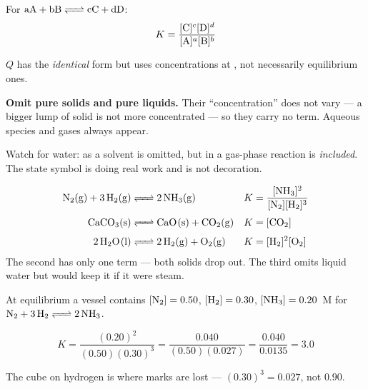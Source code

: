 \documentclass{apchem-notes}
\begin{document}


For $\ce{aA + bB <=> cC + dD}$:
\[ K = \frac{[\ce{C}]^c[\ce{D}]^d}{[\ce{A}]^a[\ce{B}]^b} \]

$Q$ has the \emph{identical} form but uses concentrations at
, not necessarily equilibrium ones.

\begin{apctrap}
\textbf{Omit pure solids and pure liquids.} Their ``concentration'' does not
vary --- a bigger lump of solid is not more concentrated --- so they carry
no term. Aqueous species and gases always appear.

Watch for water:  as a solvent is omitted, but  in a
gas-phase reaction is \emph{included}. The state symbol is doing real work
and is not decoration.
\end{apctrap}

\begin{workedexample}
\begin{align*}
  \ce{N2(g) + 3H2(g) &<=> 2NH3(g)}
    &K &= \frac{[\ce{NH3}]^2}{[\ce{N2}][\ce{H2}]^3} \\[0.3em]
  \ce{CaCO3(s) &<=> CaO(s) + CO2(g)}
    &K &= [\ce{CO2}] \\[0.3em]
  \ce{2H2O(l) &<=> 2H2(g) + O2(g)}
    &K &= [\ce{H2}]^2[\ce{O2}]
\end{align*}
The second has only one term --- both solids drop out. The third omits
liquid water but would keep it if it were steam.
\end{workedexample}



\begin{workedexample}
At equilibrium a vessel contains $[\ce{N2}] = 0.50$,
$[\ce{H2}] = 0.30$, $[\ce{NH3}] = 0.20$~M for
$\ce{N2 + 3H2 <=> 2NH3}$.

\[ K = \frac{(0.20)^2}{(0.50)(0.30)^3}
     = \frac{0.040}{(0.50)(0.027)} = \frac{0.040}{0.0135}
     = \mathbf{3.0} \]

The cube on hydrogen is where marks are lost --- $(0.30)^3 = 0.027$, not
$0.90$.
\end{workedexample}
\end{document}
